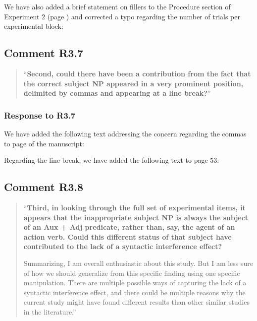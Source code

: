 \documentclass[12pt]{article}
\begin{document}
\noindent We have also added a brief statement on fillers to the Procedure section of Experiment 2 (page \pageref{fillers2}) and corrected a typo regarding the number of trials per experimental block:

\begin{quote}
\end{quote}

\subsection*{Comment R3.7}
\begin{quote}
``\textbf{Second, could there have been a contribution from the fact that the correct subject NP appeared in a very prominent position, delimited by commas and appearing at a line break?}''
\end{quote}

\subsubsection*{Response to R3.7}
We have added the following text addressing the concern regarding the commas to page \pageref{comma} of the manuscript:

\begin{quote}
\end{quote}

\noindent Regarding the line break, we have added the following text to page 53:

\begin{quote}
\end{quote}

\subsection*{Comment R3.8}
\begin{quote}
``\textbf{Third, in looking through the full set of experimental items, it appears that the inappropriate subject NP is always the subject of an Aux + Adj predicate, rather than, say, the agent of an action verb. Could this different status of that subject have contributed to the lack of a syntactic interference effect?}

Summarizing, I am overall enthusiastic about this study. But I am less sure of how we should generalize from this specific finding using one specific manipulation. There are multiple possible ways of capturing the lack of a syntactic interference effect, and there could be multiple reasons why the current study might have found different results than other similar studies in the literature.''
\end{quote}
\end{document}
